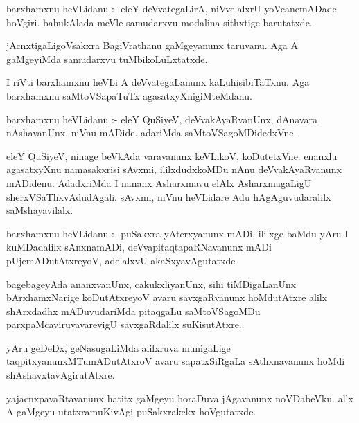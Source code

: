 \documentclass{article}
\begin{document}
\begin{mn}
barxhamxnu  heVLidanu :- eleY  deVvategaLirA,  niVvelalxrU  yoVcanemADade  
hoVgiri.  bahukAlada  meVle  samudarxvu  modalina  sithxtige  barutatxde.
\end{mn}

\begin{mn}
jAcnxtigaLigoVsakxra  BagiVrathanu  gaMgeyanunx  taruvanu.  Aga  A  gaMgeyiMda  
samudarxvu  tuMbikoLuLxtatxde.
\end{mn}

\begin{mn}
I riVti  barxhamxnu  heVLi  A  deVvategaLanunx  kaLuhisibiTaTxnu.  Aga  
barxhamxnu  saMtoVSapaTuTx  agasatxyXnigiMteMdanu.
\end{mn}

\begin{mn}
barxhamxnu  heVLidanu :- eleY  QuSiyeV,  deVvakAyaRvanUnx,  dAnavara  
nAshavanUnx,  niVnu  mADide.  adariMda  saMtoVSagoMDidedxVne.
\end{mn}

\begin{mn}
eleY  QuSiyeV,  ninage  beVkAda  varavanunx  keVLikoV,  koDutetxVne.  
enanxlu  agasatxyXnu  namasakxrisi  sAvxmi,  ililxdudxkoMDu  nAnu  
deVvakAyaRvanunx  mADidenu.  AdadxriMda  I  nananx  Asharxmavu  elAlx  
AsharxmagaLigU  sherxVSaThxvAdudAgali.  sAvxmi,  niVnu  heVLidare  Adu  
hAgAguvudaralilx  saMshayavilalx.
\end{mn}

\begin{mn}
barxhamxnu  heVLidanu :- puSakxra  yAterxyanunx  mADi,  ililxge  baMdu  
yAru  I  kuMDadalilx  sAnxnamADi,  deVvapitaqtapaRNavanunx  mADi  
pUjemADutAtxreyoV,  adelalxvU  akaSxyavAgutatxde
\end{mn}

\begin{mn}
bagebageyAda  ananxvanUnx,  cakukxliyanUnx, sihi  tiMDigaLanUnx  bArxhamxNarige  
koDutAtxreyoV  avaru  savxgaRvanunx  hoMdutAtxre  alilx  shArxdadhx  mADuvudariMda  
pitaqgaLu  saMtoVSagoMDu  parxpaMcaviruvavarevigU  savxgaRdalilx  suKisutAtxre.
\end{mn}

\begin{mn}
yAru  geDeDx,  geNasugaLiMda  alilxruva  munigaLige  taqpitxyanunxMTumADutAtxroV  
avaru  sapatxSiRgaLa  sAthxnavanunx  hoMdi  shAshavxtavAgirutAtxre.
\end{mn}

\begin{mn}
yajacnxpavaRtavanunx  hatitx  gaMgeyu  horaDuva  jAgavanunx  noVDabeVku.  
allx  A  gaMgeyu  utatxramuKivAgi  puSakxrakekx  hoVgutatxde. 
\end{mn}
\end{document}
